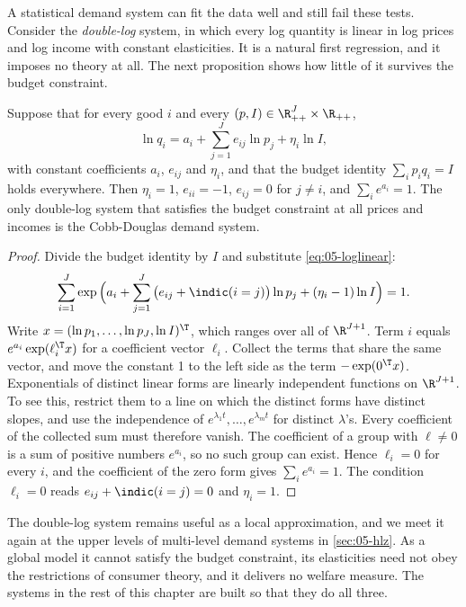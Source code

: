 A statistical demand system can fit the data well and still fail these tests. Consider the \emph{double-log}
system, in which every log quantity is linear in log prices and log income with constant elasticities. It is
a natural first regression, and it imposes no theory at all. The next proposition shows how little of it
survives the budget constraint.

\begin{proposition}\label{prop:05-loglinear}
Suppose that for every good $i$ and every $(p, I) \in \R^J_{++}\times\R_{++}$,
\begin{equation}\label{eq:05-loglinear}
\ln q_i = a_i + \sum_{j=1}^J e_{ij}\ln p_j + \eta_i\ln I ,
\end{equation}
with constant coefficients $a_i$, $e_{ij}$ and $\eta_i$, and that the budget identity $\sum_i p_iq_i = I$
holds everywhere. Then $\eta_i = 1$, $e_{ii} = -1$, $e_{ij} = 0$ for $j \neq i$, and $\sum_i e^{a_i} = 1$.
The only double-log system that satisfies the budget constraint at all prices and incomes is the
Cobb-Douglas demand system.
\end{proposition}

\begin{proof}
Divide the budget identity by $I$ and substitute \eqref{eq:05-loglinear}:
\begin{equation*}
\sum_{i=1}^J \exp\Big(a_i + \sum_{j=1}^J\big(e_{ij} + \indic(i=j)\big)\ln p_j + (\eta_i - 1)\ln I\Big) = 1 .
\end{equation*}
Write $x = (\ln p_1, \dots, \ln p_J, \ln I)^\T$, which ranges over all of $\R^{J+1}$. Term $i$ equals
$e^{a_i}\exp(\ell_i^\T x)$ for a coefficient vector $\ell_i$. Collect the terms that share the same vector,
and move the constant 1 to the left side as the term $-\exp(0^\T x)$. Exponentials of distinct linear forms
are linearly independent functions on $\R^{J+1}$. To see this, restrict them to a line on which the distinct
forms have distinct slopes, and use the independence of $e^{\lambda_1 t}, \dots, e^{\lambda_m t}$ for
distinct $\lambda$'s. Every coefficient of the collected sum must therefore vanish. The coefficient of a
group with $\ell \neq 0$ is a sum of positive numbers $e^{a_i}$, so no such group can exist. Hence
$\ell_i = 0$ for every $i$, and the coefficient of the zero form gives $\sum_i e^{a_i} = 1$. The condition
$\ell_i = 0$ reads $e_{ij} + \indic(i=j) = 0$ and $\eta_i = 1$.
\end{proof}

The double-log system remains useful as a local approximation, and we meet it again at the upper levels of
multi-level demand systems in \cref{sec:05-hlz}. As a global model it cannot satisfy the budget constraint,
its elasticities need not obey the restrictions of consumer theory, and it delivers no welfare measure. The
systems in the rest of this chapter are built so that they do all three.

